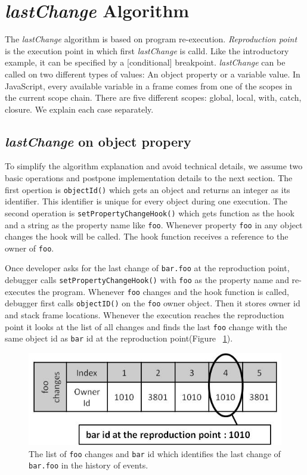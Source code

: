 \documentclass[preprint]{sigplanconf}
\begin{document}
\section{\textit{lastChange} Algorithm}

The \textit{lastChange} algorithm is based on program re-execution. \textit{Reproduction point} is the execution point in which first \textit{lastChange} is calld. Like the introductory example, it can be specified by a [conditional] breakpoint. \textit{lastChange} can be called on two different types of values: An object property or a variable value. In JavaScript, every available variable in a frame comes from one of the scopes in the current scope chain. There are five different scopes: global, local, with, catch, closure. We explain each case separately.

\subsection{\textit{lastChange} on object propery}
To simplify the algorithm explanation and avoid technical details, we assume two basic operations and postpone implementation details to the next section. The first opertion is \texttt{objectId()} which gets an object and returns an integer as its identifier. This identifier is unique for every object during one execution. The second operation is \texttt{setPropertyChangeHook()} which gets function as the hook and a string as the property name like \texttt{foo}. Whenever property \texttt{foo} in any object changes the hook will be called. The hook function receives a reference to the owner of \texttt{foo}.

Once developer asks for the last change of \texttt{bar.foo} at the reproduction point, debugger calls \texttt{setPropertyChangeHook()} with \texttt{foo} as the property name and re-executes the program. Whenever \texttt{foo} changes and the hook function is called, debugger first calls \texttt{objectID()} on the \texttt{foo} owner object. Then it stores owner id and stack frame locations. Whenever the execution reaches the reproduction point it looks at the list of all changes and finds the last \texttt{foo} change with the same object id as \texttt{bar} id at the reproduction point(Figure ~\ref{fig:foo-changes1}). 

\begin{figure}[htp]
\includegraphics[width=.48\textwidth]{6-foo-changes1.jpg}
\caption{The list of \texttt{foo} changes and \texttt{bar} id which identifies the last change of \texttt{bar.foo} in the history of events.}
\label{fig:foo-changes1}
\end{figure}
\end{document}
